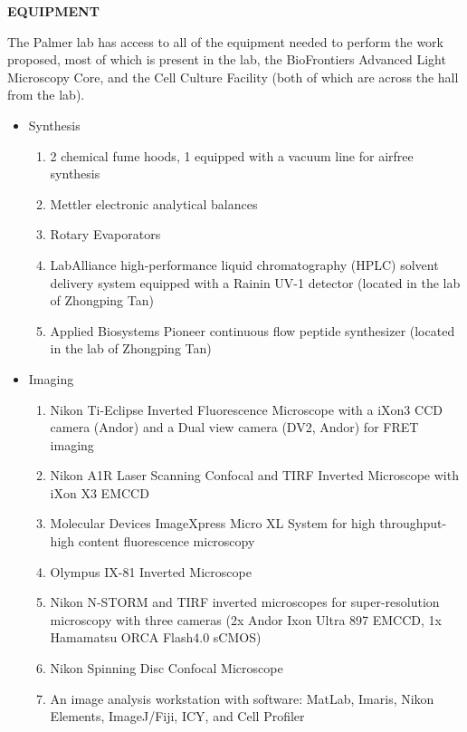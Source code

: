 


\begin{center}
\bf EQUIPMENT
\end{center}

The Palmer lab has access to all of the equipment needed to perform the work proposed, most of which is present in the lab, the BioFrontiers Advanced Light Microscopy Core, and the Cell Culture Facility (both of which are across the hall from the lab).

\begin{itemize}
  \item Synthesis \begin{enumerate}
    \item 2 chemical fume hoods, 1 equipped with a vacuum line for airfree synthesis
    \item Mettler electronic analytical balances
    \item Rotary Evaporators
    \item LabAlliance high-performance liquid chromatography (HPLC) solvent delivery system equipped with a Rainin UV-1 detector (located in the lab of Zhongping Tan)
    \item Applied Biosystems Pioneer continuous flow peptide synthesizer (located in the lab of Zhongping Tan)
  \end{enumerate}
  \item Imaging \begin{enumerate}
    \item Nikon Ti-Eclipse Inverted Fluorescence Microscope with a iXon3 CCD camera (Andor) and a Dual view camera (DV2, Andor) for FRET imaging
    \item Nikon A1R Laser Scanning Confocal and TIRF Inverted Microscope with iXon X3 EMCCD
    \item Molecular Devices ImageXpress Micro XL System for high throughput-high content fluorescence microscopy
    \item Olympus IX-81 Inverted Microscope
    \item Nikon N-STORM and TIRF inverted microscopes for super-resolution microscopy with three cameras (2x Andor Ixon Ultra 897 EMCCD, 1x Hamamatsu ORCA Flash4.0 sCMOS)
    \item Nikon Spinning Disc Confocal Microscope
    \item An image analysis workstation with software: MatLab, Imaris, Nikon Elements, ImageJ/Fiji, ICY, and Cell Profiler
  \end{enumerate}

\end{itemize}
